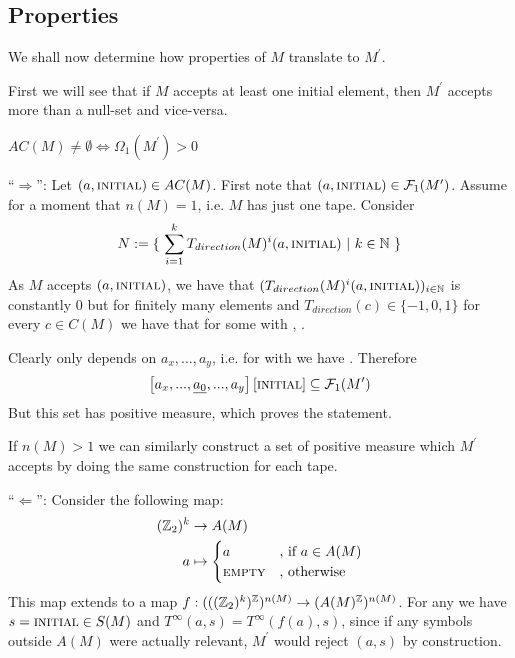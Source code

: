 \subsection{Properties}
\label{tm_to_tds:properties}

We shall now determine how properties of $M$ translate to $M^\prime$.

First we will see that if $M$ accepts at least one initial element, then $M^\prime$ accepts more than a null-set and vice-versa.
\begin{Lemma}
	\label{tm_to_tds:properties:lemma_fundamental_value}
	$AC(M) \neq \emptyset \Leftrightarrow \Omega_1(M^\prime) > 0$
\end{Lemma}
\proof
	``$\Rightarrow$'':
	Let $(a,\text{\scshape{initial}}) \in AC(M)$.
	First note that $(a,\text{\scshape{initial}}) \in \mathcal{F}_1(M^\prime)$.
	Assume for a moment that $n(M) = 1$, i.e. $M$ has just one tape. Consider
	\begin{align*}
		N := \{~ \sum_{i=1}^k T_{direction}(M)^i(a,\text{\scshape{initial}})~|~k \in \mathbb{N} ~\}
	\end{align*}
	As $M$ accepts $(a,\text{\scshape{initial}})$, we have that $(T_{direction}(M)^i(a,\text{\scshape{initial}}))_{i \in \mathbb{N}}$ is constantly $0$ but for finitely many elements
	and $T_{direction}(c) \in \{-1,0,1\}$ for every $c \in C(M)$
	we have that  for some  with , .
	
	Clearly  only depends on $a_x,...,a_y$, i.e. for  with  we have . Therefore
	\begin{align*}
		\left [ a_x,...,\underline{a_0},...,a_y \right ] \left [\text{\scshape{initial}} \right ] \subseteq \mathcal{F}_1(M^\prime)
	\end{align*}
	But this set has positive measure, which proves the statement.

	If $n(M) > 1$ we can similarly construct a set of positive measure which $M^\prime$ accepts by doing the same construction for each tape.

	``$\Leftarrow$'':
		Consider the following map:
		\begin{align*}
			(\mathbb{Z}_2)^k &\to A(M) \\
			a &\mapsto
			\begin{cases}
				a &\text{, if}~ a \in A(M) \\
				\text{\scshape{empty}} &\text{, otherwise}
			\end{cases}
		\end{align*}
		This map extends to a map $f: (((\mathbb{Z}_2)^k)^{\mathbb{Z}})^{n(M)} \to (A(M)^{\mathbb{Z}})^{n(M)}$.
		For any  we have $s = \text{\scshape{initial}} \in S(M)$ and $T^\infty(a,s) = T^\infty(f(a),s)$, since if any symbols outside $A(M)$ were actually relevant, $M^\prime$ would reject $(a,s)$ by construction.

